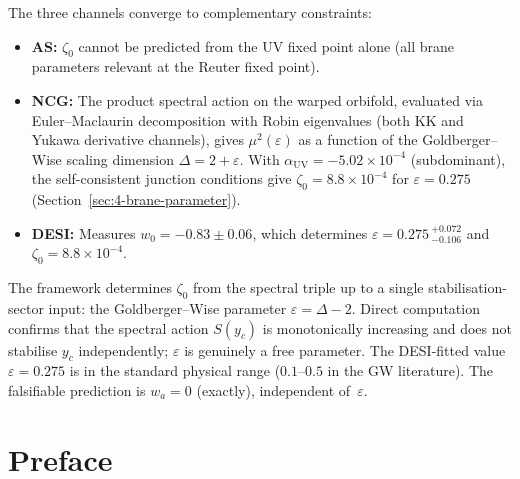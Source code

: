 The three channels converge to complementary constraints:
\begin{itemize}
  \item \textbf{AS:} $\zeta_0$ cannot be predicted from the UV fixed point alone (all brane parameters relevant at the Reuter fixed point).
  \item \textbf{NCG:} The product spectral action on the warped orbifold, evaluated via Euler--Maclaurin decomposition with Robin eigenvalues (both KK and Yukawa derivative channels), gives $\mu^2(\varepsilon)$ as a function of the Goldberger--Wise scaling dimension $\Delta = 2 + \varepsilon$.  With $\alpha_{\mathrm{UV}} = -5.02 \times 10^{-4}$ (subdominant), the self-consistent junction conditions give $\zeta_0 = 8.8 \times 10^{-4}$ for $\varepsilon = 0.275$ (Section~\ref{sec:4-brane-parameter}).
  \item \textbf{DESI:} Measures $w_0 = -0.83 \pm 0.06$, which determines $\varepsilon = 0.275\,{}^{+0.072}_{-0.106}$ and $\zeta_0 = 8.8 \times 10^{-4}$.
\end{itemize}

\noindent
The framework determines $\zeta_0$ from the spectral triple up to a single stabilisation-sector input: the Goldberger--Wise parameter $\varepsilon = \Delta - 2$.  Direct computation confirms that the spectral action $S(y_c)$ is monotonically increasing and does not stabilise $y_c$ independently; $\varepsilon$ is genuinely a free parameter.  The DESI-fitted value $\varepsilon = 0.275$ is in the standard physical range ($0.1$--$0.5$ in the GW literature).  The falsifiable prediction is $w_a = 0$ (exactly), independent of~$\varepsilon$.



\chapter*{Preface}

